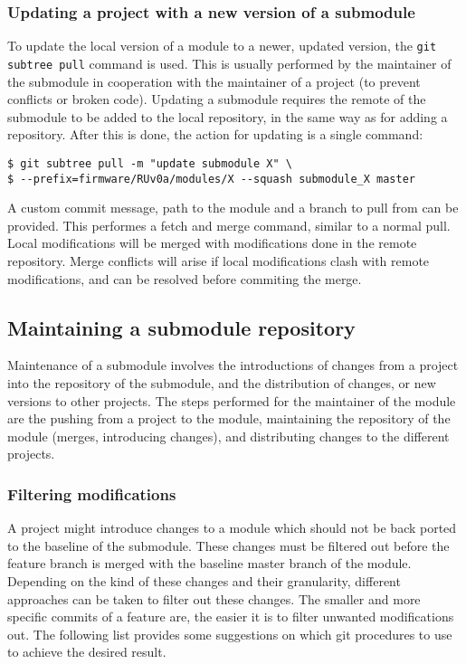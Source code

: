 \documentclass{scrartcl}
\begin{document}
\subsubsection{Updating a project with a new version of a submodule}

To update the local version of a module to a newer, updated version,
the \verb|git subtree pull| command is used. This is usually performed
by the maintainer of the submodule in cooperation with the maintainer
of a project (to prevent conflicts or broken code). Updating a
submodule requires the remote of the submodule to be added to the
local repository, in the same way as for adding a repository. After
this is done, the action for updating is a single command:

\begin{verbatim}
$ git subtree pull -m "update submodule X" \
$ --prefix=firmware/RUv0a/modules/X --squash submodule_X master
\end{verbatim}

A custom commit message, path to the module and a branch to pull from
can be provided. This performes a fetch and merge command, similar to
a normal pull. Local modifications will be merged with modifications
done in the remote repository. Merge conflicts will arise if local
modifications clash with remote modifications, and can be resolved
before commiting the merge.

\subsection{Maintaining a submodule repository}

Maintenance of a submodule involves the introductions of changes from
a project into the repository of the submodule, and the distribution of
changes, or new versions to other projects. The steps performed for
the maintainer of the module are the pushing from a project to the
module, maintaining the repository of the module (merges, introducing
changes), and distributing changes to the different projects.

\subsubsection{Filtering modifications}

A project might introduce changes to a module which should not be back
ported to the baseline of the submodule. These changes must be
filtered out before the feature branch is merged with the baseline
master branch of the module. Depending on the kind of these changes
and their granularity, different approaches can be taken to filter out
these changes. The smaller and more specific commits of a feature are,
the easier it is to filter unwanted modifications out. The following
list provides some suggestions on which git procedures to use to
achieve the desired result.
\end{document}
